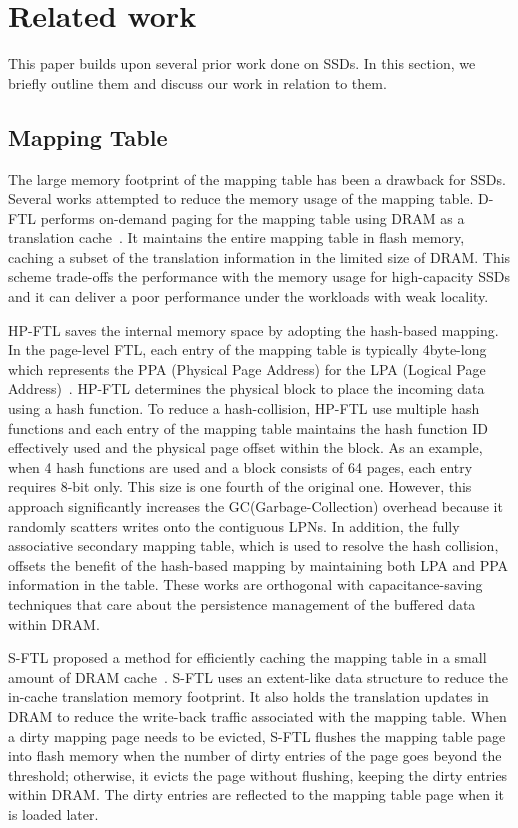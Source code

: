 \section{Related work}

\iffalse
This paper builds upon several prior work done on SSDs. In this section, we briefly outline them and discuss our work in relation to them.

\subsection{Mapping Table}
The large memory footprint of the mapping table has been a drawback for SSDs.
Several works attempted to reduce the memory usage of the mapping table. 
D-FTL performs on-demand paging for the mapping table using DRAM as a translation cache~\cite{gupta2009dftl}.
It maintains the entire mapping table in flash memory, caching a subset of the translation information in the limited size of DRAM.
This scheme trade-offs the performance with the memory usage for high-capacity SSDs and it can deliver a poor performance under the workloads with weak locality. 

HP-FTL saves the internal memory space by adopting the hash-based mapping. In the page-level FTL, each entry of the mapping table is typically 4byte-long which represents the PPA (Physical Page Address) for the LPA (Logical Page Address)~\cite{ni2017hash}. 
HP-FTL determines the physical block to place the incoming data using a hash function. To reduce a hash-collision, HP-FTL use multiple hash functions and each entry of the mapping table maintains the hash function ID effectively used and the physical page offset within the block. As an example, when 4 hash functions are used and a block consists of 64 pages, each entry requires 8-bit only. This size is one fourth of the original one. However, this approach significantly increases the GC(Garbage-Collection) overhead because it randomly scatters writes onto the contiguous LPNs. 
In addition, the fully associative secondary mapping table, which is used to resolve the hash collision, offsets the benefit of the hash-based mapping by maintaining both LPA and PPA information in the table. 
These works are orthogonal with capacitance-saving techniques that care about the persistence management of the buffered data within DRAM.

S-FTL proposed a method for efficiently caching the mapping table in a small amount of DRAM cache~\cite{jiang2011s}. S-FTL uses an extent-like data structure to reduce the in-cache translation memory footprint. It also holds the translation updates in DRAM to reduce the write-back traffic associated with the mapping table. When a dirty mapping page needs to be evicted, S-FTL flushes the mapping table page into flash memory when the number of dirty entries of the page goes beyond the threshold; otherwise, it evicts the page without flushing, keeping the dirty entries within DRAM. The dirty entries are reflected to the mapping table page when it is loaded later. 

